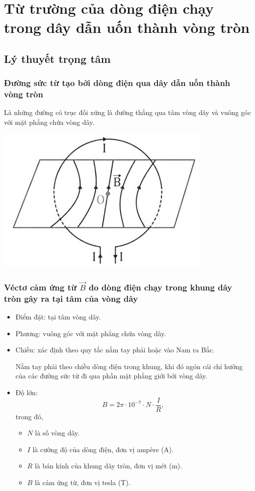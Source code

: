 \chapter{Từ trường của dòng điện chạy trong dây dẫn uốn thành vòng tròn}
\section{Lý thuyết trọng tâm}
\subsection{Đường sức từ tạo bởi dòng điện qua dây dẫn uốn thành vòng tròn}
Là những đường có trục đối xứng là đường thẳng qua tâm vòng dây và vuông góc với mặt phẳng chứa vòng dây.
\begin{center}
	\includegraphics[scale=1]{../figs/VN11-PH-26-L-018-2-h88.jpg}
\end{center}
\subsection{Véctơ cảm ứng từ $\vec{B}$ do dòng điện chạy trong khung dây tròn gây ra tại tâm của vòng dây}
\begin{itemize}
	\item Điểm đặt: tại tâm vòng dây.
	\item Phương: vuông góc với mặt phẳng chứa vòng dây. 
	\item Chiều: xác định theo quy tắc nắm tay phải hoặc vào Nam ra Bắc.
	
	Nắm tay phải theo chiều dòng điện trong khung, khi đó ngón cái chỉ hướng của các đường sức từ đi qua phần mặt phẳng giới bởi vòng dây.
	
	\item Độ lớn:  
	\begin{equation}
	B=2\pi\cdot 10^{-7}\cdot N\cdot \dfrac{I}{R},
	\end{equation}
	trong đó,
	\begin{itemize}
		\item $N$ là số vòng dây.
		\item $I$ là cường độ của dòng điện, đơn vị ampère (A). 
		\item $R$ là bán kính của khung dây tròn, đơn vị mét (m). 
		\item $B$ là cảm ứng từ, đơn vị tesla (T).
	\end{itemize}
	
\end{itemize}

